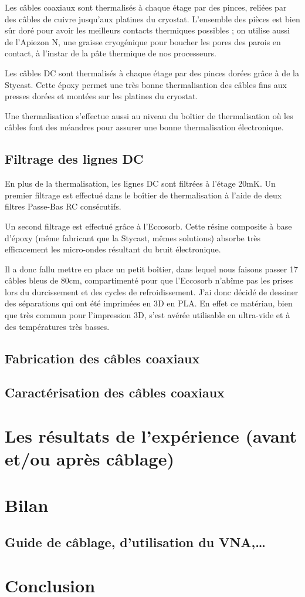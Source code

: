 \documentclass[a4paper,11pt]{report}
\begin{document}
Les câbles coaxiaux sont thermalisés à chaque étage par des pinces, reliées par des câbles de cuivre jusqu'aux platines du cryostat. L'ensemble des pièces est bien sûr doré pour avoir les meilleurs contacts thermiques possibles ; on utilise aussi de l'Apiezon N, une graisse cryogénique pour boucher les pores des parois en contact, à l'instar de la pâte thermique de nos processeurs.
\newline

Les câbles DC sont thermalisés à chaque étage par des pinces dorées grâce à de la Stycast. Cette époxy permet une très bonne thermalisation des câbles fins aux presses dorées et montées sur les platines du cryostat.

Une thermalisation s'effectue aussi au niveau du boîtier de thermalisation où les câbles font des méandres pour assurer une bonne thermalisation électronique.

\section{Filtrage des lignes DC}
En plus de la thermalisation, les lignes DC sont filtrées à l'étage 20mK. Un premier filtrage est effectué dans le boîtier de thermalisation à l'aide de deux filtres Passe-Bas RC consécutifs.

Un second filtrage est effectué grâce à l'Eccosorb. Cette résine composite à base d'époxy (même fabricant que la Stycast, mêmes solutions) absorbe très efficacement les micro-ondes résultant du bruit électronique.

Il a donc fallu mettre en place un petit boîtier, dans lequel nous faisons passer 17 câbles bleus de 80cm, compartimenté pour que l'Eccosorb n'abîme pas les prises lors du durcissement et des cycles de refroidissement. J'ai donc décidé de dessiner des séparations qui ont été imprimées en 3D en PLA. En effet ce matériau, bien que très commun pour l'impression 3D, s'est avérée utilisable en ultra-vide et à des températures très basses.



\section{Fabrication des câbles coaxiaux}

\section{Caractérisation des câbles coaxiaux}


\chapter{Les résultats de l'expérience (avant et/ou après câblage)}

\chapter{Bilan}
\section{Guide de câblage, d'utilisation du VNA,…}
\chapter*{Conclusion}
%



\end{document}
